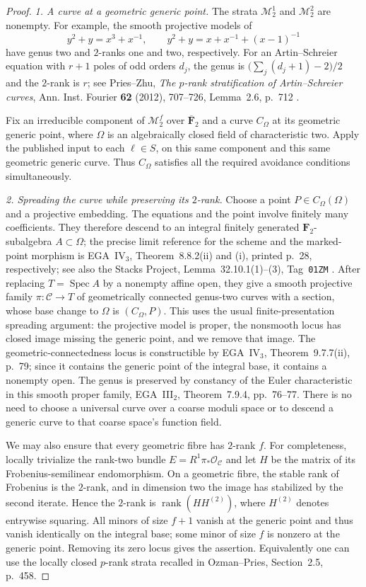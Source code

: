 \documentclass[11pt,a4paper]{article}
\begin{document}
\begin{proof}
\emph{1. A curve at a geometric generic point.}
The strata $\mathcal M_2^1$ and $\mathcal M_2^2$ are nonempty.  For
example, the smooth projective models of
\[
 y^2+y=x^3+x^{-1},\qquad
 y^2+y=x+x^{-1}+(x-1)^{-1}
\]
have genus two and $2$-ranks one and two, respectively.  For an
Artin--Schreier equation with $r+1$ poles of odd orders $d_j$, the
genus is $\bigl(\sum_j(d_j+1)-2\bigr)/2$ and the $2$-rank is $r$;
see Pries--Zhu, \emph{The $p$-rank stratification of Artin--Schreier
curves}, Ann. Inst. Fourier \textbf{62} (2012), 707--726,
Lemma~2.6, p.~712 \cite{PriesZhu2012}.

Fix an irreducible component of $\mathcal M_2^f$ over
$\overline{\mathbf F}_2$ and a curve $C_\Omega$ at its geometric generic
point, where $\Omega$ is an algebraically closed field of characteristic
two.  Apply the published input to each $\ell\in S$, on this same
component and this same geometric generic curve.  Thus $C_\Omega$
satisfies all the required avoidance conditions simultaneously.

\emph{2. Spreading the curve while preserving its $2$-rank.}
Choose a point $P\in C_\Omega(\Omega)$ and a projective embedding.
The equations and the point involve finitely many coefficients.
They therefore descend to an integral finitely generated
$\mathbf F_2$-subalgebra $A\subset\Omega$; the precise limit reference
for the scheme and the marked-point morphism is EGA~IV$_3$,
Theorem~8.8.2(ii) and (i), printed p.~28, respectively;
see also the Stacks Project, Lemma~32.10.1(1)--(3),
Tag~\texttt{01ZM} \cite{EGAIV3,Stacks}.
After replacing
$T=\operatorname{Spec}A$ by a nonempty affine open, they give a smooth
projective family $\pi:\mathcal C\to T$ of geometrically connected
genus-two curves with a section, whose base change to $\Omega$ is
$(C_\Omega,P)$.  This uses the usual finite-presentation spreading
argument: the projective model is proper, the nonsmooth locus has
closed image missing the generic point, and we remove that image.
The geometric-connectedness locus is constructible by EGA~IV$_3$,
Theorem~9.7.7(ii), p.~79; since it contains the generic point of
the integral base, it contains a nonempty open.  The genus is
preserved by constancy of the Euler characteristic in this smooth
proper family, EGA~III$_2$, Theorem~7.9.4, pp.~76--77.
There is no need to choose a universal curve over a coarse moduli
space or to descend a generic curve to that coarse space's function
field.

We may also ensure that every geometric fibre has $2$-rank $f$.
For completeness, locally trivialize the rank-two bundle
$E=R^1\pi_*\mathcal O_{\mathcal C}$ and let $H$ be the matrix of its
Frobenius-semilinear endomorphism.  On a geometric fibre, the stable
rank of Frobenius is the $2$-rank, and in dimension two the image has
stabilized by the second iterate.  Hence the $2$-rank is
$\operatorname{rank}(H H^{(2)})$, where $H^{(2)}$ denotes entrywise
squaring.  All minors of size $f+1$ vanish at the generic point and
thus vanish identically on the integral base; some minor of size $f$
is nonzero at the generic point.  Removing its zero locus gives the
assertion.  Equivalently one can use the locally closed $p$-rank
strata recalled in Ozman--Pries, Section~2.5, p.~458.


\end{proof}
\end{document}
